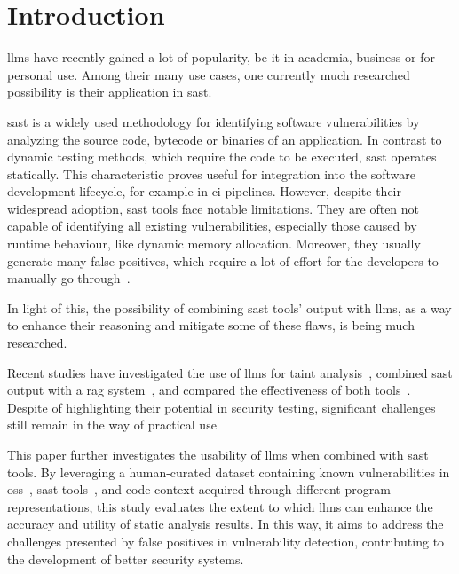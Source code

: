 \section{Introduction}
\label{sec:intro}
\Acp{llm} have recently gained a lot of popularity, be it in academia, business or for personal use.
Among their many use cases, one currently much researched possibility is their application in \ac{sast}.

\Acl{sast} is a widely used methodology for identifying software vulnerabilities by analyzing the source code, bytecode or binaries of an application.
In contrast to dynamic testing methods, which require the code to be executed, \ac{sast} operates statically.
This characteristic proves useful for integration into the software development lifecycle, for example in \ac{ci} pipelines.
However, despite their widespread adoption, \ac{sast} tools face notable limitations.
They are often not capable of identifying all existing vulnerabilities, especially those caused by runtime behaviour, like dynamic memory allocation.
Moreover, they usually generate many false positives, which require a lot of effort for the developers to manually go through~\cite{8804441}.

In light of this, the possibility of combining \ac{sast} tools' output with \acp{llm}, as a way to enhance their reasoning and mitigate some of these flaws, is being much researched.

Recent studies have investigated the use of \acp{llm} for taint analysis~\cite{li2024llmassistedstaticanalysisdetecting}, combined \ac{sast} output with a \ac{rag} system~\cite{du2024vulragenhancingllmbasedvulnerability,keltek2024boostingcybersecurityvulnerabilityscanning}, and compared the effectiveness of both tools~\cite{zhou2024comparisonstaticapplicationsecurity}.
Despite of highlighting their potential in security testing, significant challenges still remain in the way of practical use~\cite{ding2024vulnerabilitydetectioncodelanguage}

This paper further investigates the usability of \acp{llm} when combined with \ac{sast} tools. 
By leveraging a human-curated dataset containing known vulnerabilities in \ac{oss}~\cite{BugOSS}, \ac{sast} tools~\cite{codeql,infer}, and code context acquired through different program representations, this study evaluates the extent to which \acp{llm} can enhance the accuracy and utility of static analysis results.
In this way, it aims to address the challenges presented by false positives in vulnerability detection, contributing to the development of better security systems.
